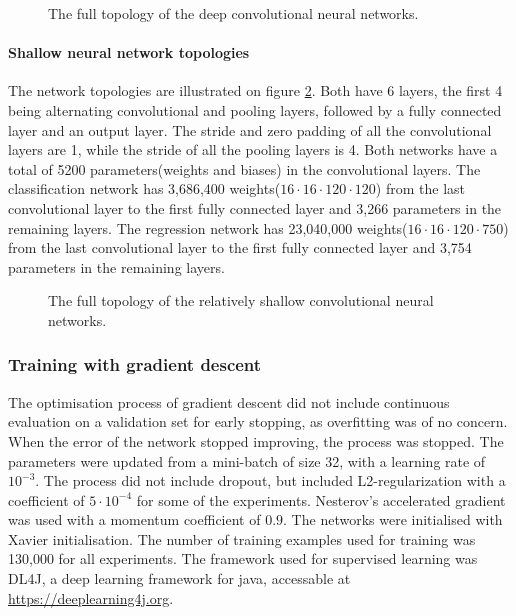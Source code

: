 \begin{figure}[H]
	\begin{scriptsize}
		\sffamily
		\def\svgwidth{\textwidth}
		
	\end{scriptsize}
	\caption{The full topology of the deep convolutional neural networks.}
	\label{fig:architectureOfDeepNet}
\end{figure}

\paragraph{Shallow neural network topologies}
The network topologies are illustrated on figure \ref{fig:architectureOfShallowNet}. Both have 6 layers, the first 4 being alternating convolutional and pooling layers, followed by a fully connected layer and an output layer.  The stride and zero padding of all the convolutional layers are 1, while the stride of all the pooling layers is 4. Both networks have a total of 5200 parameters(weights and biases) in the convolutional layers.
The classification network has 3,686,400 weights($16 \cdot 16 \cdot 120 \cdot 120$) from the last convolutional layer to the first fully connected layer and 3,266 parameters in the remaining layers.
The regression network has 23,040,000 weights($16 \cdot 16 \cdot 120 \cdot 750$) from the last convolutional layer to the first fully connected layer and 3,754 parameters in the remaining layers.

\begin{figure}[H]
	\begin{scriptsize}
		\sffamily
		\def\svgwidth{\textwidth}
		
	\end{scriptsize}
	\caption{The full topology of the relatively shallow convolutional neural networks.}
	\label{fig:architectureOfShallowNet}
\end{figure}

\subsubsection{Training with gradient descent}
The optimisation process of gradient descent did not include continuous evaluation on a validation set for early stopping, as overfitting was of no concern. When the error of the network stopped improving, the process was stopped. The parameters were updated from a mini-batch of size 32, with a learning rate of $10^{-3}$. The process did not include dropout, but included L2-regularization with a coefficient of $5 \cdot 10^{-4}$ for some of the experiments. Nesterov's accelerated gradient was used with a momentum coefficient of $0.9$. The networks were initialised with Xavier initialisation. The number of training examples used for training was 130,000 for all experiments. The framework used for supervised learning was DL4J, a deep learning framework for java, accessable at \url{https://deeplearning4j.org}.

